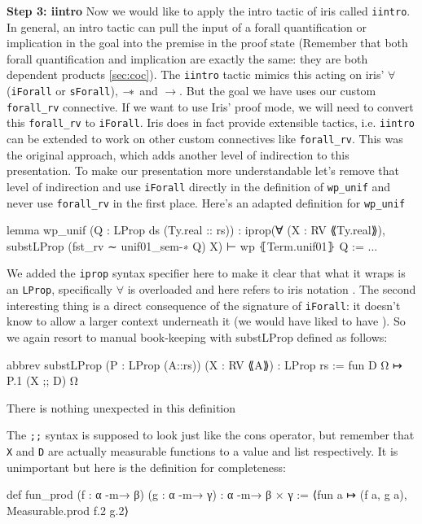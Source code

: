 \textbf{Step 3: iintro}
Now we would like to apply the intro tactic of iris called \texttt{iintro}. In general, an intro tactic can pull the input of a forall quantification or implication in the goal
into the premise in the proof state (Remember that both forall quantification and implication are exactly the same: they are both dependent products \ref{sec:coc}). The \texttt{iintro} tactic
mimics this acting on iris' $\forall$ (\texttt{iForall} or \texttt{sForall}), $\mathbin{-\!*}$ and $\to$. But the goal we have uses our custom \texttt{forall\_rv} connective. If we want to use Iris'
proof mode, we will need to convert this \texttt{forall\_rv} to \texttt{iForall}. Iris does in fact provide extensible tactics, i.e. \texttt{iintro} can be extended to work on other custom connectives
like \texttt{forall\_rv}. This was the original approach, which adds another level of indirection to this presentation. To make our presentation more understandable let's remove that level of indirection
and use \texttt{iForall} directly in the definition of \texttt{wp\_unif} and never use \texttt{forall\_rv} in the first place. Here's an adapted definition for \texttt{wp\_unif}

\begin{leancode}
lemma wp_unif (Q : LProp ds (Ty.real :: rs)) :
  iprop(∀ (X : RV ⟪Ty.real⟫), substLProp (fst_rv ∼ unif01_sem-∗ Q) X) ⊢ wp ⦃Term.unif01⦄ Q := ...
\end{leancode}

We added the \texttt{iprop} syntax specifier here to make it clear that what it wraps is an \texttt{LProp}, specifically $\forall$ is overloaded and here refers to iris notation .
The second interesting thing is a direct consequence of the signature of \texttt{iForall}: it doesn't know to allow a larger context underneath it (we would have liked to have ).
So we again resort to manual book-keeping with substLProp defined as follows:

\begin{leancode}
abbrev substLProp (P : LProp (A::rs)) (X : RV ⟪A⟫) : LProp rs :=
  fun D Ω ↦ P.1 (X ;; D) Ω
\end{leancode}

There is nothing unexpected in this definition

The \texttt{;;} syntax is supposed to look just like the cons operator, but remember that \texttt{X} and \texttt{D} are actually measurable functions to a value and list respectively.
It is unimportant but here is the definition for completeness:
\begin{leancode}
def fun_prod (f : α -m→ β) (g : α -m→ γ) : α -m→ β × γ :=
  ⟨fun a ↦ (f a, g a), Measurable.prod f.2 g.2⟩
\end{leancode}

